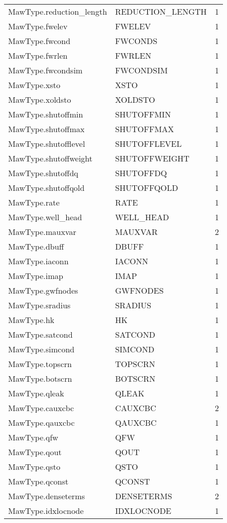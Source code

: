 \begin{longtable}{p{6cm} p{4cm} p{2cm} }
MawType.reduction\_length &  REDUCTION\_LENGTH & 1 \\ 
MawType.fwelev &  FWELEV & 1 \\ 
MawType.fwcond &  FWCONDS & 1 \\ 
MawType.fwrlen &  FWRLEN & 1 \\ 
MawType.fwcondsim &  FWCONDSIM & 1 \\ 
MawType.xsto &  XSTO & 1 \\ 
MawType.xoldsto &  XOLDSTO & 1 \\ 
MawType.shutoffmin &  SHUTOFFMIN & 1 \\ 
MawType.shutoffmax &  SHUTOFFMAX & 1 \\ 
MawType.shutofflevel &  SHUTOFFLEVEL & 1 \\ 
MawType.shutoffweight &  SHUTOFFWEIGHT & 1 \\ 
MawType.shutoffdq &  SHUTOFFDQ & 1 \\ 
MawType.shutoffqold &  SHUTOFFQOLD & 1 \\ 
MawType.rate &  RATE & 1 \\ 
MawType.well\_head &  WELL\_HEAD & 1 \\ 
MawType.mauxvar &  MAUXVAR & 2 \\ 
MawType.dbuff &  DBUFF & 1 \\ 
MawType.iaconn &  IACONN & 1 \\ 
MawType.imap &  IMAP & 1 \\ 
MawType.gwfnodes &  GWFNODES & 1 \\ 
MawType.sradius &  SRADIUS & 1 \\ 
MawType.hk &  HK & 1 \\ 
MawType.satcond &  SATCOND & 1 \\ 
MawType.simcond &  SIMCOND & 1 \\ 
MawType.topscrn &  TOPSCRN & 1 \\ 
MawType.botscrn &  BOTSCRN & 1 \\ 
MawType.qleak &  QLEAK & 1 \\ 
MawType.cauxcbc &  CAUXCBC & 2 \\ 
MawType.qauxcbc &  QAUXCBC & 1 \\ 
MawType.qfw &  QFW & 1 \\ 
MawType.qout &  QOUT & 1 \\ 
MawType.qsto &  QSTO & 1 \\ 
MawType.qconst &  QCONST & 1 \\ 
MawType.denseterms &  DENSETERMS & 2 \\ 
MawType.idxlocnode &  IDXLOCNODE & 1 \\ 

\end{longtable}
